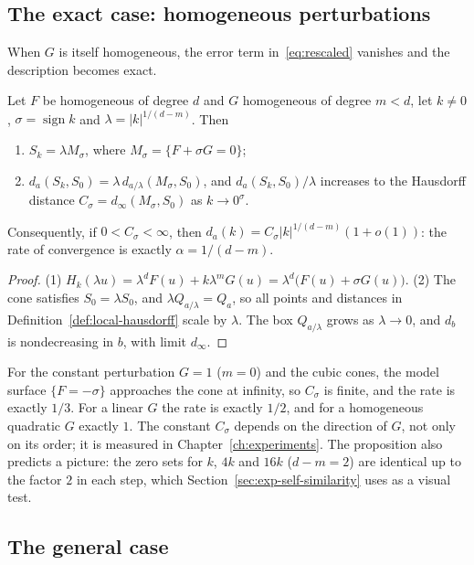 \subsection{The exact case: homogeneous perturbations}

When $G$ is itself homogeneous, the error term in~\eqref{eq:rescaled}
vanishes and the description becomes exact.

\begin{proposition}
\label{prop:self-similar}
Let $F$ be homogeneous of degree $d$ and $G$ homogeneous of degree $m<d$, let
$k\neq0$, $\sigma=\operatorname{sign}k$ and $\lambda=|k|^{1/(d-m)}$. Then
\begin{enumerate}
    \item $S_k=\lambda M_\sigma$, where $M_\sigma=\{F+\sigma G=0\}$;
    \item $d_a(S_k,S_0)=\lambda\,d_{a/\lambda}(M_\sigma,S_0)$, and
          $d_a(S_k,S_0)/\lambda$ increases to the Hausdorff distance
          $C_\sigma=d_\infty(M_\sigma,S_0)$ as $k\to0^\sigma$.
\end{enumerate}
Consequently, if $0<C_\sigma<\infty$, then $d_a(k)=C_\sigma|k|^{1/(d-m)}(1+o(1))$:
the rate of convergence is exactly $\alpha=1/(d-m)$.
\end{proposition}

\begin{proof}
(1) $H_k(\lambda u)=\lambda^dF(u)+k\lambda^mG(u)=\lambda^d\big(F(u)+\sigma G(u)\big)$.
(2) The cone satisfies $S_0=\lambda S_0$, and $\lambda Q_{a/\lambda}=Q_a$, so
all points and distances in Definition~\ref{def:local-hausdorff} scale by
$\lambda$. The box $Q_{a/\lambda}$ grows as $\lambda\to0$, and $d_b$ is
nondecreasing in $b$, with limit $d_\infty$.
\end{proof}

For the constant perturbation $G=1$ ($m=0$) and the cubic cones, the model
surface $\{F=-\sigma\}$ approaches the cone at infinity, so $C_\sigma$ is
finite, and the rate is exactly $1/3$. For a linear $G$ the rate is exactly
$1/2$, and for a homogeneous quadratic $G$ exactly $1$. The constant
$C_\sigma$ depends on the direction of $G$, not only on its order; it is
measured in Chapter~\ref{ch:experiments}. The proposition also predicts a
picture: the zero sets for $k$, $4k$ and $16k$ ($d-m=2$) are identical up to
the factor $2$ in each step, which Section~\ref{sec:exp-self-similarity} uses
as a visual test.

\subsection{The general case}

